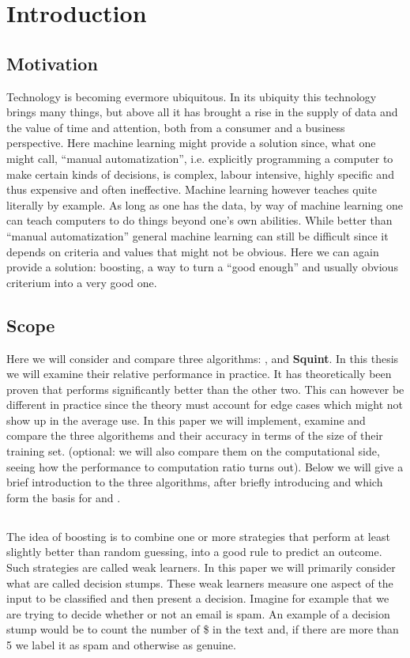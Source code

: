 
\chapter{Introduction}
\label{chap:intro}
\section{Motivation}
\label{sec:motiv}

Technology is becoming evermore ubiquitous. In its ubiquity this technology brings many things, but above all it has brought a rise in the supply of data and the value of time and attention, both from a consumer and a business perspective. Here machine learning might provide a solution since, what one might call, ``manual automatization'', i.e. explicitly programming a computer to make certain kinds of decisions, is complex, labour intensive, highly specific and thus expensive and often ineffective. Machine learning however teaches quite literally by example. As long as one has the data, by way of machine learning one can teach computers to do things beyond one's own abilities. While better than ``manual automatization'' general machine learning can still be difficult since it depends on criteria and values that might not be obvious. Here we can again provide a solution: boosting, a way to turn a ``good enough'' and usually obvious criterium into a very good one.

\section{Scope} Here we will consider and compare three algorithms: \adaB, \adaN and \textbf{Squint}. In this thesis we will examine their relative performance in practice. It has theoretically been proven that \squint performs significantly better than the other two. This can however be different in practice since the theory must account for edge cases which might not show up in the average use. In this paper we will implement, examine and compare the three algorithems and their accuracy in terms of the size of their training set. (optional: we will also compare them on the computational side, seeing how the performance to computation ratio turns out). Below we will give a brief introduction to the three algorithms, after briefly introducing \hedge and \weak which form the basis for \adaB and \adaN.

\section{\weak}
The idea of boosting is to combine one or more strategies that perform at least slightly better than random guessing, into a good rule to predict an outcome. Such strategies are called weak learners. In this paper we will primarily consider what are called decision stumps. These weak learners measure one aspect of the input to be classified and then present a decision. Imagine for example that we are trying to decide whether or not an email is spam. An example of a decision stump would be to count the number of \$ in the text and, if there are more than 5 we label it as spam and otherwise as genuine. 

